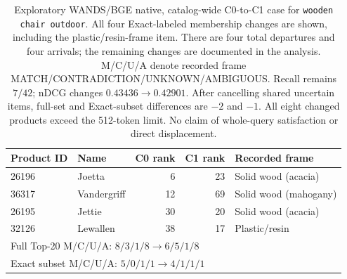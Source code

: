 \begin{table}[t]
\centering
\small
\begin{tabular}{llrrl}
\toprule
Product ID & Name & C0 rank & C1 rank & Recorded frame \\
\midrule
26196 & Joetta & 6 & 23 & Solid wood (acacia) \\
36317 & Vandergriff & 12 & 69 & Solid wood (mahogany) \\
26195 & Jettie & 30 & 20 & Solid wood (acacia) \\
32126 & Lewallen & 38 & 17 & Plastic/resin \\
\midrule
\multicolumn{5}{l}{Full Top-20 M/C/U/A: $8/3/1/8 \to 6/5/1/8$} \\
\multicolumn{5}{l}{Exact subset M/C/U/A: $5/0/1/1 \to 4/1/1/1$} \\
\bottomrule
\end{tabular}
\caption{Exploratory WANDS/BGE native, catalog-wide C0-to-C1 case for
\texttt{wooden chair outdoor}. All four Exact-labeled membership changes
are shown, including the plastic/resin-frame item. There are four total
departures and four arrivals; the remaining changes are documented in the
analysis. M/C/U/A denote recorded frame MATCH/CONTRADICTION/UNKNOWN/AMBIGUOUS.
Recall remains $7/42$; nDCG changes $0.43436\to0.42901$.
After cancelling shared uncertain items, full-set and Exact-subset
differences are $-2$ and $-1$. All eight changed products exceed the
512-token limit. No claim of whole-query satisfaction or direct displacement.}
\label{tab:query-constraint-illustration}
\end{table}
